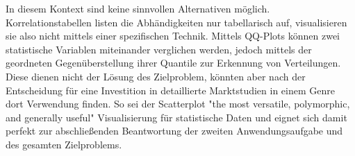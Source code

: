 \documentclass[usegeometry=true]{scrartcl}
\begin{document}
In diesem Kontext sind keine sinnvollen Alternativen möglich. 
Korrelationstabellen listen die Abhändigkeiten nur tabellarisch auf, visualisieren sie also nicht mittels einer spezifischen Technik.
Mittels QQ-Plots können zwei statistische Variablen miteinander verglichen werden, jedoch mittels der geordneten Gegenüberstellung ihrer Quantile zur Erkennung von Verteilungen.
Diese dienen nicht der Lösung des Zielproblem, könnten aber nach der Entscheidung für eine Investition in detaillierte Marktstudien in einem Genre dort Verwendung finden.
So sei der Scatterplot "the most versatile, polymorphic, and generally useful"%
Visualisierung für statistische Daten und eignet sich damit perfekt zur abschließenden Beantwortung der zweiten Anwendungsaufgabe und des gesamten Zielproblems.




\end{document}
